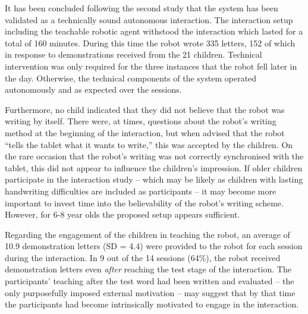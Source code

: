 \documentclass{sig-alternate}
\begin{document}

It has been concluded following the second study that the system has 
been validated as a technically sound autonomous interaction. 
The interaction setup including the teachable
robotic agent withstood the interaction which lasted for a total of 160 minutes. 
During this time the robot wrote 335 letters, 152 of which in response to
demonstrations received from the 21 children. Technical 
intervention was only required for the three instances that the robot fell 
later in the day. Otherwise, the technical components of the system operated 
autonomously and as expected over the sessions.

Furthermore, no child indicated that they did not believe that the robot was writing
by itself. There were, at times, 
    questions about the robot's writing method at the beginning of the interaction,
    but when advised that the robot ``tells the tablet what it wants to write,''
    this was accepted by the children. 
    On the rare occasion that the
    robot's writing was not correctly synchronised with the tablet, this did
    not appear to influence the children's impression. 
    If older children participate in the interaction study --
    which may be likely as children with lasting handwriting difficulties are included
    as participants -- it may become more important to invest time into the
    believability of the robot's writing scheme. However, for 6-8 year olds the
    proposed setup appears sufficient.

Regarding the engagement of the children in teaching the robot, 
    an average of 10.9 demonstration letters (SD = 4.4) were
    provided to the robot for each session during the interaction.
    In 9 out of the 14 sessions (64\%), the robot received demonstration letters
    even \emph{after} reaching the test stage of the interaction. The participants'
    teaching after the test word had been written and evaluated -- the only
    purposefully imposed external motivation -- may suggest that by that time
    the participants had become intrinsically motivated to engage in the
    interaction.
\end{document}
